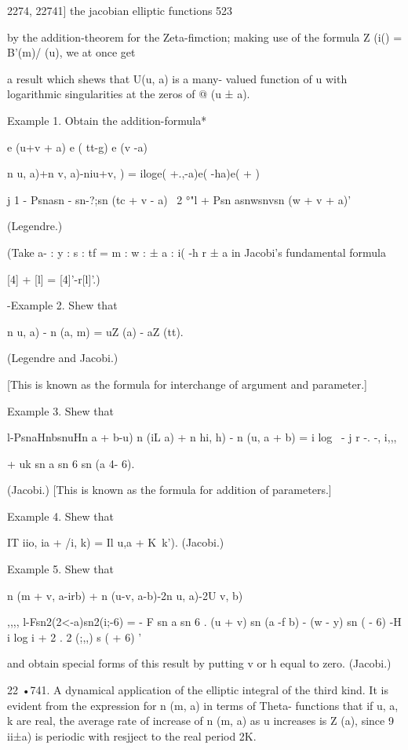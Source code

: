 2274, 22741] the jacobian elliptic functions 523

by the addition-theorem for the Zeta-fimction; making use of the
formula Z (i() = B'(m)/ (u), we at once get

a result which shews that U(u, a) is a many- valued function of u with
logarithmic singularities at the zeros of @ (u ± a).

Example 1. Obtain the addition-formula*

e (u+v + a) e ( tt-g) e (v -a)

n u, a)+n v, a)-niu+v, ) = iloge( +.,-a)e( -ha)e( + )

j 1 - Psnasn - sn-?;sn (tc + v - a) ~2 °"l + Psn asnwsnvsn (w + v +
a)'

(Legendre.)

(Take a- : y : s : tf = m : w : ± a : i( -h r ± a in Jacobi's
fundamental formula

[4] + [l] = [4]'-r[l]'.)

-Example 2. Shew that

n u, a) - n (a, m) = uZ (a) - aZ (tt).

(Legendre and Jacobi.)

[This is known as the formula for interchange of argument and
parameter.]

Example 3. Shew that

l-PsnaHnbsnuHn a + b-u) n (iL a) + n hi, h) - n (u, a + b) = i log \,
- j r -. -, i,,,\

+ uk sn a sn 6 sn (a 4- 6).

(Jacobi.) [This is known as the formula for addition of parameters.]

Example 4. Shew that

IT iio, ia + /i, k) = Il u,a + K\ k'). (Jacobi.)

Example 5. Shew that

n (m + v, a-irb) + n (u-v, a-b)-2n u, a)-2U v, b)

,,,, l-Fsn2(2<-a)sn2(i;-6) = - F sn a sn 6 . (u + v) sn (a -f b) -
(w - y) sn ( - 6) -H i log i + 2 . 2 (;,,) s ( + 6) '

and obtain special forms of this result by putting v or h equal to
zero. (Jacobi.)

22 •741. A dynamical application of the elliptic integral of the third
kind. It is evident from the expression for n (m, a) in terms of
Theta- functions that if u, a, k are real, the average rate of
increase of n (m, a) as u increases is Z (a), since 9 ii±a) is
periodic with resjject to the real period 2K.

